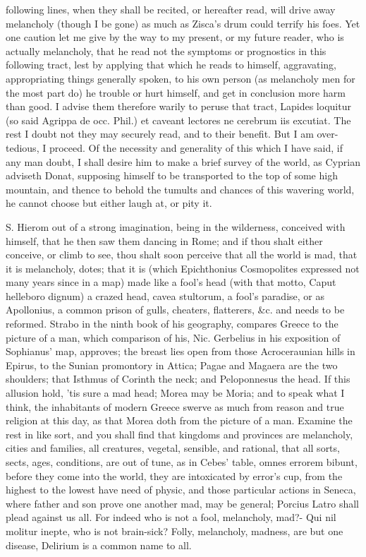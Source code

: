 {following lines, when they shall be recited, or hereafter read, will
drive away melancholy (though I be gone) as much as Zisca's drum could
terrify his foes. Yet one caution let me give by the way to my present,
or my future reader, who is actually melancholy, that he read not the
symptoms or prognostics in this following tract, lest by applying
that which he reads to himself, aggravating, appropriating things
generally spoken, to his own person (as melancholy men for the most
part do) he trouble or hurt himself, and get in conclusion more harm
than good. I advise them therefore warily to peruse that tract, Lapides
loquitur (so said Agrippa de occ. Phil.) et caveant lectores ne
cerebrum iis excutiat. The rest I doubt not they may securely read, and
to their benefit. But I am over-tedious, I proceed.
Of the necessity and generality of this which I have said, if any man
doubt, I shall desire him to make a brief survey of the world, as 
Cyprian adviseth Donat, supposing himself to be transported to the top
of some high mountain, and thence to behold the tumults and chances of
this wavering world, he cannot choose but either laugh at, or pity it.

S. Hierom out of a strong imagination, being in the wilderness,
conceived with himself, that he then saw them dancing in Rome; and if
thou shalt either conceive, or climb to see, thou shalt soon perceive
that all the world is mad, that it is melancholy, dotes; that it is
(which Epichthonius Cosmopolites expressed not many years since in a
map) made like a fool's head (with that motto, Caput helleboro dignum)
a crazed head, cavea stultorum, a fool's paradise, or as Apollonius, a
common prison of gulls, cheaters, flatterers, \&c. and needs to be
reformed. Strabo in the ninth book of his geography, compares Greece to
the picture of a man, which comparison of his, Nic. Gerbelius in his
exposition of Sophianus' map, approves; the breast lies open from those
Acroceraunian hills in Epirus, to the Sunian promontory in Attica;
Pagae and Magaera are the two shoulders; that Isthmus of Corinth the
neck; and Peloponnesus the head. If this allusion hold, 'tis sure a mad
head; Morea may be Moria; and to speak what I think, the inhabitants of
modern Greece swerve as much from reason and true religion at this day,
as that Morea doth from the picture of a man. Examine the rest in like
sort, and you shall find that kingdoms and provinces are melancholy,
cities and families, all creatures, vegetal, sensible, and rational,
that all sorts, sects, ages, conditions, are out of tune, as in Cebes'
table, omnes errorem bibunt, before they come into the world, they are
intoxicated by error's cup, from the highest to the lowest have need of
physic, and those particular actions in Seneca, where father and
son prove one another mad, may be general; Porcius Latro shall plead
against us all. For indeed who is not a fool, melancholy, mad?-
Qui nil molitur inepte, who is not brain-sick? Folly, melancholy,
madness, are but one disease, Delirium is a common name to all.

}
